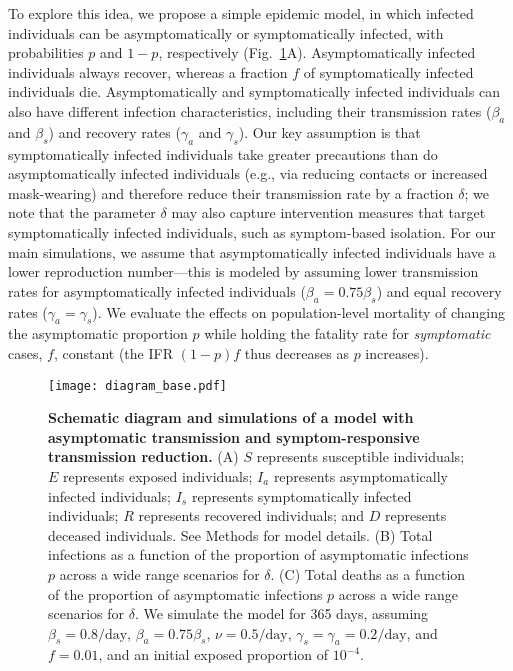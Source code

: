 \documentclass[12pt]{article}
\newcommand{\fref}[1]{Fig.~\ref{fig:#1}}
\begin{document}
To explore this idea, we propose a simple epidemic model,
in which infected individuals can be asymptomatically or symptomatically infected, with probabilities $p$ and $1-p$, respectively (\fref{base}A).  
Asymptomatically infected individuals always recover, whereas a fraction $f$ of symptomatically infected individuals die.
Asymptomatically and symptomatically infected individuals can also have different infection characteristics, including their transmission rates ($\beta_a$ and $\beta_s$) and recovery rates ($\gamma_a$ and $\gamma_s$).
Our key assumption is that symptomatically infected individuals take greater precautions than do asymptomatically infected individuals (e.g., via reducing contacts or increased mask-wearing) and therefore reduce their transmission rate by a fraction $\delta$;
we note that the parameter $\delta$ may also capture intervention measures that target symptomatically infected individuals, such as symptom-based isolation. 
For our main simulations, we assume that asymptomatically infected individuals have a lower reproduction number---this is modeled by assuming lower transmission rates for asymptomatically infected individuals ($\beta_a = 0.75 \beta_s$) and equal recovery rates ($\gamma_a = \gamma_s$).
We evaluate the effects on population-level mortality of changing the asymptomatic proportion $p$ while holding the fatality rate for \emph{symptomatic} cases, $f$, constant (the IFR $(1-p)f$ thus decreases as $p$ increases).
\begin{figure}[!ht]
\texttt{[image: diagram\_base.pdf]}
\caption{
\textbf{Schematic diagram and simulations of a model with asymptomatic transmission and symptom-responsive transmission reduction.}
(A) $S$ represents susceptible individuals; $E$ represents exposed individuals; $I_a$ represents asymptomatically infected individuals; $I_s$ represents symptomatically infected individuals; $R$ represents recovered individuals; and $D$ represents deceased individuals. See Methods for model details.
(B) Total infections as a function of the proportion of asymptomatic infections $p$ across a wide range scenarios for $\delta$.
(C) Total deaths as a function of the proportion of asymptomatic infections $p$ across a wide range scenarios for $\delta$.
We simulate the model for 365 days, assuming $\beta_s = 0.8/\mathrm{day}$, $\beta_a = 0.75 \beta_s$, $\nu=0.5/\mathrm{day}$, $\gamma_s=\gamma_a=0.2/\mathrm{day}$, and $f=0.01$, and an initial exposed proportion of $10^{-4}$.
}
\label{fig:base}
\end{figure}
\end{document}
